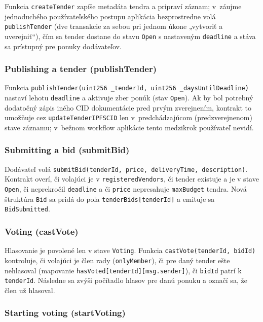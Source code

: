 Funkcia \texttt{createTender} zapíše metadáta tendra a pripraví záznam; v~záujme
jednoduchého používateľského postupu aplikácia bezprostredne volá
\texttt{publishTender} (dve transakcie za sebou pri jednom úkone „vytvoriť a
uverejniť“), čím sa tender dostane do stavu \texttt{Open} s nastaveným
\texttt{deadline} a stáva sa prístupný pre ponuky dodávateľov.

\subsubsection{Publishing a tender (publishTender)}

Funkcia \texttt{publishTender(uint256 \_tenderId, uint256 \_daysUntilDeadline)}
nastaví lehotu \texttt{deadline} a aktivuje zber ponúk (stav \texttt{Open}). Ak by
bol potrebný dodatočný zápis iného CID dokumentácie pred prvým zverejnením, kontrakt
to umožňuje cez \texttt{updateTenderIPFSCID} len v~predchádzajúcom (predzverejnenom)
stave záznamu; v~bežnom workflow aplikácie tento medzikrok používateľ nevidí.

\subsubsection{Submitting a bid (submitBid)}

Dodávateľ volá \texttt{submitBid(tenderId, price, deliveryTime, description)}. Kontrakt overí, či volajúci je v \texttt{registeredVendors}, či tender existuje a je v stave \texttt{Open}, či neprekročil \texttt{deadline} a či \texttt{price} nepresahuje \texttt{maxBudget} tendra. Nová štruktúra \texttt{Bid} sa pridá do poľa \texttt{tenderBids[tenderId]} a emituje sa \texttt{BidSubmitted}.

\subsubsection{Voting (castVote)}

Hlasovanie je povolené len v stave \texttt{Voting}. Funkcia \texttt{castVote(tenderId, bidId)} kontroluje, či volajúci je člen rady (\texttt{onlyMember}), či pre daný tender ešte nehlasoval (mapovanie \texttt{hasVoted[tenderId][msg.sender]}), či \texttt{bidId} patrí k \texttt{tenderId}. Následne sa zvýši počítadlo hlasov pre danú ponuku a označí sa, že člen už hlasoval.

\subsubsection{Starting voting (startVoting)}

